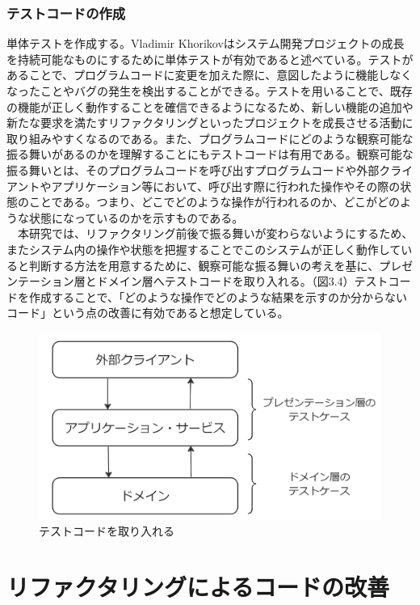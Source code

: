\documentclass[12pt, a4paper]{jreport}
\begin{document}
\subsection{テストコードの作成}
単体テストを作成する。Vladimir Khorikov\cite{Tantai}はシステム開発プロジェクトの成長を持続可能なものにするために単体テストが有効であると述べている。テストがあることで、プログラムコードに変更を加えた際に、意図したように機能しなくなったことやバグの発生を検出することができる。テストを用いることで、既存の機能が正しく動作することを確信できるようになるため、新しい機能の追加や新たな要求を満たすリファクタリングといったプロジェクトを成長させる活動に取り組みやすくなるのである。また、プログラムコードにどのような観察可能な振る舞いがあるのかを理解することにもテストコードは有用である。観察可能な振る舞いとは、そのプログラムコードを呼び出すプログラムコードや外部クライアントやアプリケーション等において、呼び出す際に行われた操作やその際の状態のことである。つまり、どこでどのような操作が行われるのか、どこがどのような状態になっているのかを示すものである。
\\　本研究では、リファクタリング前後で振る舞いが変わらないようにするため、またシステム内の操作や状態を把握することでこのシステムが正しく動作していると判断する方法を用意するために、観察可能な振る舞いの考えを基に、プレゼンテーション層とドメイン層へテストコードを取り入れる。（図3.4）テストコードを作成することで、「どのような操作でどのような結果を示すのか分からないコード」という点の改善に有効であると想定している。
\begin{figure}[H]
\centering
\includegraphics[width=1\linewidth]{image/layerTest.png}
\caption{テストコードを取り入れる}
\label{fig:enter-label}
\end{figure}
\chapter{リファクタリングによるコードの改善}
\end{document}
